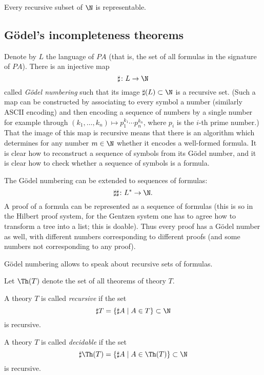 \begin{page}

\begin{thm}
\label{thm:ReprThm}
Every recursive subset of $\N$ is representable.
\end{thm}

\end{page}

\begin{page}

\subsection{G\"odel's incompleteness theorems}
Denote by $L$ the language of $PA$ (that is, the set of all formulas in the signature of $PA$).
There is an injective map
\[
\sharp \colon L \to \N
\]
called \emph{G\"odel numbering} such that its image $\sharp(L) \subset \N$ is a recursive set.
(Such a map can be constructed by associating to every symbol a number (similarly ASCII encoding) and then encoding a sequence of numbers by a single number
for example through $(k_1, \ldots, k_n) \mapsto p_1^{k_1} \cdots p_n^{k_n}$, where $p_i$ is the $i$-th prime number.)
That the image of this map is recursive means that there is an algorithm which determines for any number $m \in \N$ whether it encodes a well-formed formula.
It is clear how to reconstruct a sequence of symbols from its G\"odel number, and it is clear how to check whether a sequence of symbols is a formula.

The G\"odel numbering can be extended to sequences of formulas:
\[
\sharp\sharp \colon L^* \to \N.
\]
A proof of a formula can be represented as a sequence of formulas
(this is so in the Hilbert proof system, for the Gentzen system one has to agree how to transform a tree into a list; this is doable).
Thus every proof has a G\"odel number as well, with different numbers corresponding to different proofs (and some numbers not corresponding to any proof).

G\"odel numbering allows to speak about recursive sets of formulas.

Let $\Th(T)$ denote the set of all theorems of theory $T$.


\end{page}

\begin{page}

\begin{dfn}
A theory $T$ is called \emph{recursive} if the set
\[
\sharp T = \{\sharp A \mid A \in T\} \subset \N
\]
is recursive.

A theory $T$ is called \emph{decidable} if the set
\[
\sharp \Th(T) = \{\sharp A \mid A \in \Th(T)\} \subset \N
\]
is recursive.
\end{dfn}

\end{page}

